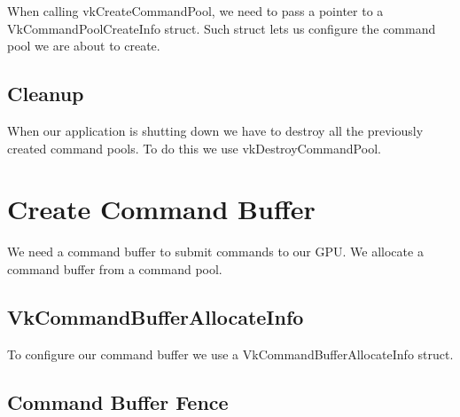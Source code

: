 When calling vkCreateCommandPool, we need to pass a pointer to a
VkCommandPoolCreateInfo struct.
Such struct lets us configure the command pool we are about to create.

\begin{minipage}{\linewidth}{\noindent}
    
\end{minipage}

\subsection{Cleanup}

When our application is shutting down we have to destroy all the previously created
command pools.
To do this we use vkDestroyCommandPool.

\section{Create Command Buffer}

We need a command buffer to submit commands to our GPU.
We allocate a command buffer from a command pool.

\begin{minipage}{\linewidth}{\noindent}
    
\end{minipage}

\subsection{VkCommandBufferAllocateInfo}

To configure our command buffer we use a VkCommandBufferAllocateInfo struct.

\begin{minipage}{\linewidth}{\noindent}
    
\end{minipage}

\subsection{Command Buffer Fence}

